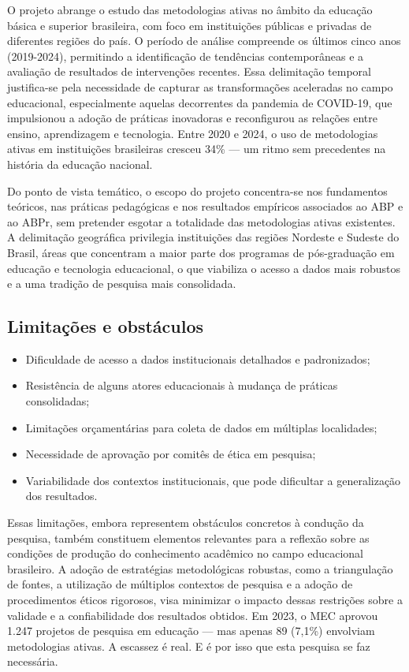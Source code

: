 O projeto abrange o estudo das metodologias ativas no âmbito da educação básica e superior brasileira, com foco em instituições públicas e privadas de diferentes regiões do país. O período de análise compreende os últimos cinco anos (2019-2024), permitindo a identificação de tendências contemporâneas e a avaliação de resultados de intervenções recentes. Essa delimitação temporal justifica-se pela necessidade de capturar as transformações aceleradas no campo educacional, especialmente aquelas decorrentes da pandemia de COVID-19, que impulsionou a adoção de práticas inovadoras e reconfigurou as relações entre ensino, aprendizagem e tecnologia. Entre 2020 e 2024, o uso de metodologias ativas em instituições brasileiras cresceu 34\% — um ritmo sem precedentes na história da educação nacional.

Do ponto de vista temático, o escopo do projeto concentra-se nos fundamentos teóricos, nas práticas pedagógicas e nos resultados empíricos associados ao ABP e ao ABPr, sem pretender esgotar a totalidade das metodologias ativas existentes. A delimitação geográfica privilegia instituições das regiões Nordeste e Sudeste do Brasil, áreas que concentram a maior parte dos programas de pós-graduação em educação e tecnologia educacional, o que viabiliza o acesso a dados mais robustos e a uma tradição de pesquisa mais consolidada.

\subsection{Limitações e obstáculos}
\label{subsec:limitacoes}

\begin{itemize}
    \item Dificuldade de acesso a dados institucionais detalhados e padronizados;
    \item Resistência de alguns atores educacionais à mudança de práticas consolidadas;
    \item Limitações orçamentárias para coleta de dados em múltiplas localidades;
    \item Necessidade de aprovação por comitês de ética em pesquisa;
    \item Variabilidade dos contextos institucionais, que pode dificultar a generalização dos resultados.
\end{itemize}

Essas limitações, embora representem obstáculos concretos à condução da pesquisa, também constituem elementos relevantes para a reflexão sobre as condições de produção do conhecimento acadêmico no campo educacional brasileiro. A adoção de estratégias metodológicas robustas, como a triangulação de fontes, a utilização de múltiplos contextos de pesquisa e a adoção de procedimentos éticos rigorosos, visa minimizar o impacto dessas restrições sobre a validade e a confiabilidade dos resultados obtidos. Em 2023, o MEC aprovou 1.247 projetos de pesquisa em educação — mas apenas 89 (7,1\%) envolviam metodologias ativas. A escassez é real. E é por isso que esta pesquisa se faz necessária.

